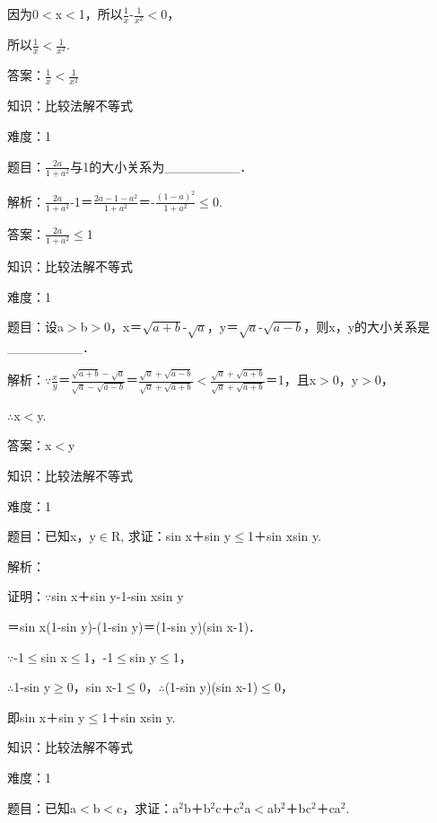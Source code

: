 \documentclass{article} %
\begin{document}
因为0$\mathrm{<}$x$\mathrm{<}$1，所以$\frac{1}{x}$-$\frac{1}{x^2}\mathrm{<}$0，

所以$\frac{1}{x}\mathrm{<}\frac{1}{x^2}$.

 答案：$\frac{1}{x}\mathrm{<}\frac{1}{x^2}$



 知识：比较法解不等式

 难度：1

 题目：$\frac{2a}{1+a^2}$与1的大小关系为\_\_\_\_\_\_\_\_．

 解析：$\frac{2a}{1+a^2}$-1＝$\frac{2a-1-a^2}{1+a^2}$＝-$\frac{(1-a)^2}{1+a^2}$$\mathrm{\le}$0.

 答案：$\frac{2a}{1+a^2}\mathrm{\le}$1



 知识：比较法解不等式

 难度：1

 题目：设a$\mathrm{>}$b$\mathrm{>}$0，x＝$\sqrt{a+b}$-$\sqrt{a}$，y＝$\sqrt{a}$-$\sqrt{a-b}$，则x，y的大小关系是\_\_\_\_\_\_\_\_．

 解析：$\mathrm{\because}$$\frac{x}{y}$＝$\frac{\sqrt{a+b}-\sqrt{a}}{\sqrt{a}-\sqrt{a-b}}$＝$\frac{\sqrt{a}+\sqrt{a-b}}{\sqrt{a}+\sqrt{a+b}}$$\mathrm{<}$$\frac{\sqrt{a}+\sqrt{a+b}}{\sqrt{a}+\sqrt{a+b}}$＝1，且x$\mathrm{>}$0，y$\mathrm{>}$0，

$\mathrm{\therefore}$x$\mathrm{<}$y.

 答案：x$\mathrm{<}$y



 知识：比较法解不等式

 难度：1

 题目：已知x，y$\mathrm{\in}$R, 求证：sin x＋sin y$\mathrm{\le}$1＋sin xsin y.

 解析：

 证明：$\mathrm{\because}$sin x＋sin y-1-sin xsin y

＝sin x(1-sin y)-(1-sin y)＝(1-sin y)(sin x-1)．

$\mathrm{\because}$-1$\mathrm{\le}$sin x$\mathrm{\le}$1，-1$\mathrm{\le}$sin y$\mathrm{\le}$1，

$\mathrm{\therefore}$1-sin y$\mathrm{\ge}$0，sin x-1$\mathrm{\le}$0，$\mathrm{\therefore}$(1-sin y)(sin x-1)$\mathrm{\le}$0，

即sin x＋sin y$\mathrm{\le}$1＋sin xsin y.



 知识：比较法解不等式

 难度：1

 题目：已知a$\mathrm{<}$b$\mathrm{<}$c，求证：a${}^{2}$b＋b${}^{2}$c＋c${}^{2}$a$\mathrm{<}$ab${}^{2}$＋bc${}^{2}$＋ca${}^{2}$.
\end{document}
